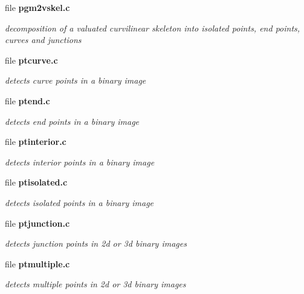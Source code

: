\begin{CompactItemize}
\item 
file \bf{pgm2vskel.c}
\begin{CompactList}\small\item\em decomposition of a valuated curvilinear skeleton into isolated points, end points, curves and junctions \item\end{CompactList}

\item 
file \bf{ptcurve.c}
\begin{CompactList}\small\item\em detects curve points in a binary image \item\end{CompactList}

\item 
file \bf{ptend.c}
\begin{CompactList}\small\item\em detects end points in a binary image \item\end{CompactList}

\item 
file \bf{ptinterior.c}
\begin{CompactList}\small\item\em detects interior points in a binary image \item\end{CompactList}

\item 
file \bf{ptisolated.c}
\begin{CompactList}\small\item\em detects isolated points in a binary image \item\end{CompactList}

\item 
file \bf{ptjunction.c}
\begin{CompactList}\small\item\em detects junction points in 2d or 3d binary images \item\end{CompactList}

\item 
file \bf{ptmultiple.c}
\begin{CompactList}\small\item\em detects multiple points in 2d or 3d binary images \item\end{CompactList}


\end{CompactItemize}
